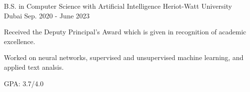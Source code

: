 

\begin{cventries}
	
	\cventry
	{B.S. in Computer Science with Artificial Intelligence} %
	{Heriot-Watt University} %
	{Dubai} %
	{Sep. 2020 - June 2023} %
	{
		\begin{cvitems} %
			\item {Received the Deputy Principal's Award which is given in recognition of academic excellence.}
            \item {Worked on neural networks, supervised and unsupervised machine learning, and applied text analsis.}
			\item {GPA: 3.7/4.0}
		\end{cvitems}
	}
	
\end{cventries}
